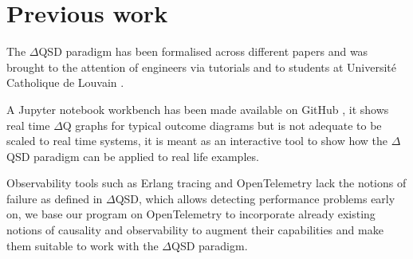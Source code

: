 \section{Previous work}
    The $\Delta$QSD paradigm has been formalised across different papers \cite{art} \cite{myo} and was brought to the attention of engineers via tutorials \cite{dq-tut} and to students at Université Catholique de Louvain \cite{dq-ucl}. 
    
    A Jupyter notebook workbench has been made available on GitHub \cite{dqsd-wkb}, it shows real time $\Delta$Q graphs for typical outcome diagrams but is not adequate to be scaled to real time systems, it is meant as an interactive tool to show how the $\Delta$QSD paradigm can be applied to real life examples.
    
    Observability tools such as Erlang tracing \cite{erl-t} and OpenTelemetry \cite{otel-e} lack the notions of failure as defined in $\Delta$QSD, which allows detecting performance problems early on, we base our program on OpenTelemetry to incorporate already existing notions of causality and observability to augment their capabilities and make them suitable to work with the $\Delta$QSD paradigm.
